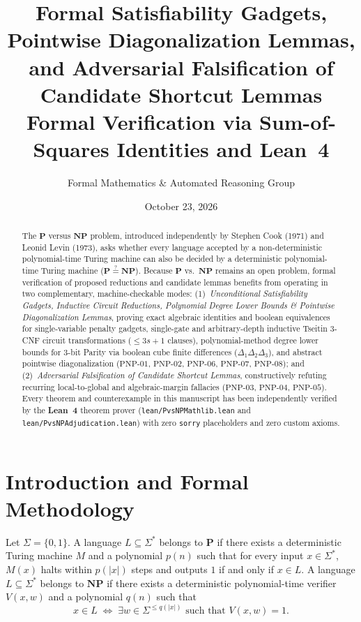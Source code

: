 \documentclass[11pt,a4paper]{article}
\title{\textbf{Formal Satisfiability Gadgets, Pointwise Diagonalization Lemmas, and Adversarial Falsification of Candidate Shortcut Lemmas}\\
\large Formal Verification via Sum-of-Squares Identities and Lean~4}
\author{Formal Mathematics \& Automated Reasoning Group}
\date{October 23, 2026}
\theoremstyle{plain}
\theoremstyle{definition}
\theoremstyle{remark}
\newcommand{\ClassP}{\mathbf{P}}
\newcommand{\ClassNP}{\mathbf{NP}}
\begin{document}
\maketitle

\begin{abstract}
The $\ClassP$ versus $\ClassNP$ problem, introduced independently by Stephen Cook (1971) and Leonid Levin (1973), asks whether every language accepted by a non-deterministic polynomial-time Turing machine can also be decided by a deterministic polynomial-time Turing machine ($\ClassP \stackrel{?}{=} \ClassNP$). Because $\ClassP$ vs.\ $\ClassNP$ remains an open problem, formal verification of proposed reductions and candidate lemmas benefits from operating in two complementary, machine-checkable modes:
(1)~\emph{Unconditional Satisfiability Gadgets, Inductive Circuit Reductions, Polynomial Degree Lower Bounds \& Pointwise Diagonalization Lemmas}, proving exact algebraic identities and boolean equivalences for single-variable penalty gadgets, single-gate and arbitrary-depth inductive Tseitin 3-CNF circuit transformations ($\le 3s+1$ clauses), polynomial-method degree lower bounds for 3-bit Parity via boolean cube finite differences ($\Delta_1\Delta_2\Delta_3$), and abstract pointwise diagonalization ($\mathrm{PNP\text{-}01}$, $\mathrm{PNP\text{-}02}$, $\mathrm{PNP\text{-}06}$, $\mathrm{PNP\text{-}07}$, $\mathrm{PNP\text{-}08}$); and
(2)~\emph{Adversarial Falsification of Candidate Shortcut Lemmas}, constructively refuting recurring local-to-global and algebraic-margin fallacies ($\mathrm{PNP\text{-}03}$, $\mathrm{PNP\text{-}04}$, $\mathrm{PNP\text{-}05}$).
Every theorem and counterexample in this manuscript has been independently verified by the \textbf{Lean~4} theorem prover (\texttt{lean/PvsNPMathlib.lean} and \texttt{lean/PvsNPAdjudication.lean}) with zero \texttt{sorry} placeholders and zero custom axioms.
\end{abstract}

\tableofcontents
\bigskip

\section{Introduction and Formal Methodology}

Let $\Sigma = \{0, 1\}$. A language $L \subseteq \Sigma^*$ belongs to $\ClassP$ if there exists a deterministic Turing machine $M$ and a polynomial $p(n)$ such that for every input $x \in \Sigma^*$, $M(x)$ halts within $p(|x|)$ steps and outputs $1$ if and only if $x \in L$. A language $L \subseteq \Sigma^*$ belongs to $\ClassNP$ if there exists a deterministic polynomial-time verifier $V(x, w)$ and a polynomial $q(n)$ such that
\begin{equation}
  x \in L \;\Longleftrightarrow\; \exists w \in \Sigma^{\le q(|x|)} \text{ such that } V(x, w) = 1.
\end{equation}
\end{document}
